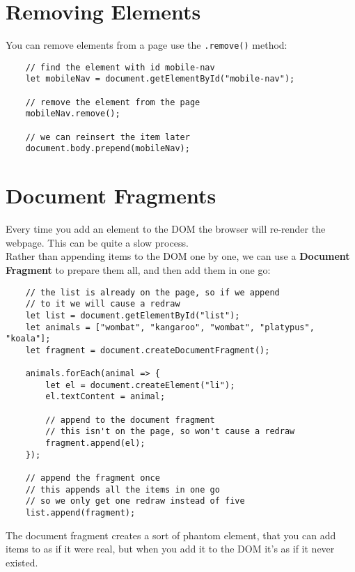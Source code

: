 \section{Removing Elements}

You can remove elements from a page use the \texttt{.remove()} method:

\begin{verbatim}
    // find the element with id mobile-nav
    let mobileNav = document.getElementById("mobile-nav");

    // remove the element from the page
    mobileNav.remove();

    // we can reinsert the item later
    document.body.prepend(mobileNav);
\end{verbatim}

\pagebreak

\section{Document Fragments}

Every time you add an element to the DOM the browser will re-render the webpage. This can be quite a slow process.
\\

Rather than appending items to the DOM one by one, we can use a \textbf{Document Fragment} to prepare them all, and then add them in one go:

\begin{verbatim}
    // the list is already on the page, so if we append
    // to it we will cause a redraw
    let list = document.getElementById("list");
    let animals = ["wombat", "kangaroo", "wombat", "platypus", "koala"];
    let fragment = document.createDocumentFragment();

    animals.forEach(animal => {
        let el = document.createElement("li");
        el.textContent = animal;

        // append to the document fragment
        // this isn't on the page, so won't cause a redraw
        fragment.append(el);
    });

    // append the fragment once
    // this appends all the items in one go
    // so we only get one redraw instead of five
    list.append(fragment);
\end{verbatim}

The document fragment creates a sort of phantom element, that you can add items to as if it were real, but when you add it to the DOM it's as if it never existed.
\\

